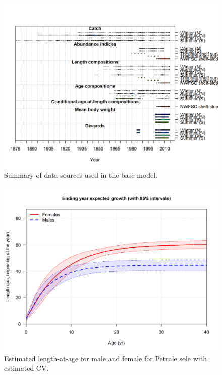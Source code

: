 \documentclass[12pt,]{article}
\begin{document}
\FloatBarrier

\begin{figure}[htbp]
\centering
\includegraphics{r4ss/plots_mod1/data_plot2.png}
\caption{Summary of data sources used in the base model.
\label{fig:data_plot}}
\end{figure}

\FloatBarrier

\begin{figure}[htbp]
\centering
\includegraphics{r4ss/plots_mod1/bio1_sizeatage.png}
\caption{Estimated length-at-age for male and female for Petrale sole
with estimated CV. \label{fig:sizeatage}}
\end{figure}
\end{document}
